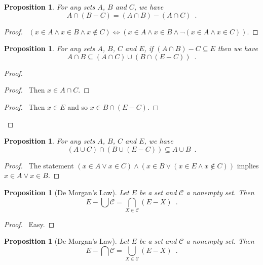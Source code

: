 \documentclass{report}
\let\qed\relax
\newtheorem{prop}[ax]{Proposition}
\theoremstyle{definition}
\begin{document}
\begin{prop}
For any sets $A$, $B$ and $C$, we have
\[ A \cap (B - C) = (A \cap B) - (A \cap C) \enspace . \]
\end{prop}

\begin{proof}
\pf\ $(x \in A \wedge x \in B \wedge x \notin C) \Leftrightarrow (x \in A \wedge x \in B \wedge \neg (x \in A \wedge x \in C))$. \qed
\end{proof}

\begin{prop}
For any sets $A$, $B$, $C$ and $E$, if $(A \cap B) - C \subseteq E$ then we have
\[ A \cap B \subseteq (A \cap C) \cup (B \cap (E - C)) \enspace . \]
\end{prop}

\begin{proof}
\pf
{}
\begin{proof}
	\pf\ Then $x \in A \cap C$.
\end{proof}
\begin{proof}
	\pf\ Then $x \in E$ and so $x \in B \cap (E - C)$.
\end{proof}
\qed
\end{proof}

\begin{prop}
For any sets $A$, $B$, $C$ and $E$, we have
\[ (A \cup C) \cap (B \cup (E - C)) \subseteq A \cup B \enspace . \]
\end{prop}

\begin{proof}
\pf\ The statement $(x \in A \vee x \in C) \wedge (x \in B \vee (x \in E \wedge x \notin C))$ implies $x \in A \vee x \in B$. \qed
\end{proof}

\begin{prop}[De Morgan's Law]
Let $E$ be a set and $\mathcal{C}$ a nonempty set. Then
\[ E - \bigcup \mathcal{C} = \bigcap_{X \in \mathcal{C}} (E - X) \enspace . \]
\end{prop}

\begin{proof}
\pf\ Easy. \qed
\end{proof}

\begin{prop}[De Morgan's Law]
Let $E$ be a set and $\mathcal{C}$ a nonempty set. Then
\[ E - \bigcap \mathcal{C} = \bigcup_{X \in \mathcal{C}} (E - X) \enspace . \]
\end{prop}
\end{document}
